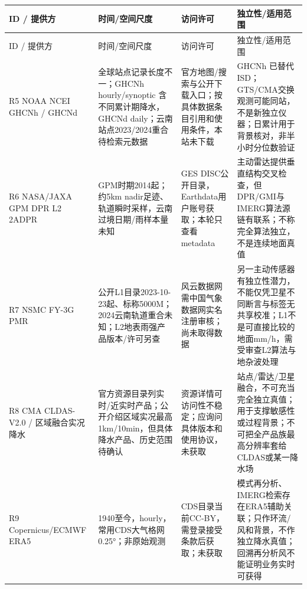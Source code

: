 \documentclass[UTF8,fontset=fandol,10pt]{ctexart}
\begin{document}
\begingroup\small\setlength{\tabcolsep}{3pt}\renewcommand{\arraystretch}{1.12}
\begin{longtable}{>{\raggedright\arraybackslash}p{\dimexpr(\linewidth-8\tabcolsep)/4\relax}>{\raggedright\arraybackslash}p{\dimexpr(\linewidth-8\tabcolsep)/4\relax}>{\raggedright\arraybackslash}p{\dimexpr(\linewidth-8\tabcolsep)/4\relax}>{\raggedright\arraybackslash}p{\dimexpr(\linewidth-8\tabcolsep)/4\relax}}
\toprule
ID /\allowbreak{} 提供方 & 时间/\allowbreak{}空间尺度 & 访问许可 & 独立性/\allowbreak{}适用范围 \\
\midrule\endfirsthead
ID /\allowbreak{} 提供方 & 时间/\allowbreak{}空间尺度 & 访问许可 & 独立性/\allowbreak{}适用范围 \\
\midrule\endhead
R5 NOAA NCEI GHCNh /\allowbreak{} GHCNd & 全球站点记录长度不一；GHCNh hourly/\allowbreak{}synoptic 含不同累计期降水，GHCNd daily；云南站点2023/\allowbreak{}2024重合待检索元数据 & 官方地图/\allowbreak{}搜索与公开下载入口；按具体数据条目引用和使用条件，本站未下载 & GHCNh 已替代 ISD；GTS/\allowbreak{}CMA交换观测可能同站，不是新独立仪器；日累计用于背景核对，非半小时分位数验证 \\
R6 NASA/\allowbreak{}JAXA GPM DPR L2 2ADPR & GPM时期2014起；约5km nadir足迹、轨道瞬时采样，云南过境日期/\allowbreak{}雨样本量未知 & GES DISC公开目录，Earthdata用户账号获取；本轮只查看metadata & 主动雷达提供垂直结构交叉检查，但DPR/\allowbreak{}GMI与IMERG算法源链有联系；不称完全算法独立，不是连续地面真值 \\
R7 NSMC FY-3G PMR & 公开L1目录2023-10-23起、标称5000M；2024云南轨道重合未知；L2地表雨强产品版本/\allowbreak{}许可另查 & 风云数据网需中国气象数据网实名注册审核；尚未取得数据 & 另一主动传感器有独立性潜力，不能仅凭卫星不同断言与标签无共享校准；L1不是可直接比较的地面mm/\allowbreak{}h，需受审查L2算法与地杂波处理 \\
R8 CMA CLDAS-V2.0 /\allowbreak{} 区域融合实况降水 & 官方资源目录列实时/\allowbreak{}近实时产品；公开介绍区域实况最高1km/\allowbreak{}10min，但具体降水产品、历史范围待确认 & 资源详情可访问性不稳定；应询问具体版本和使用协议，未获取 & 站点/\allowbreak{}雷达/\allowbreak{}卫星融合，不可充当完全独立真值；用于支撑敏感性或过程背景；不可把全产品族最高分辨率套给CLDAS或某一降水场 \\
R9 Copernicus/\allowbreak{}ECMWF ERA5 & 1940至今，hourly，常用CDS大气格网0.25°；非原始观测 & CDS目录当前CC-BY，需登录接受条款后获取；未获取 & 模式再分析、IMERG检索存在ERA5辅助关联；只作环流/\allowbreak{}风和背景，不作独立降水真值；回溯再分析风不能证明业务实时可获得 \\
\bottomrule\end{longtable}\endgroup
\end{document}
